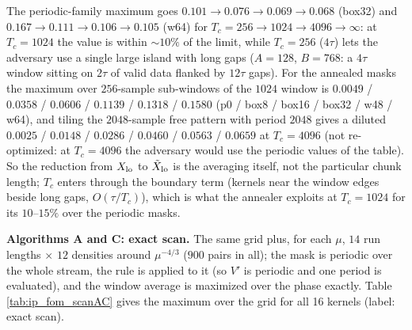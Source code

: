 \documentclass{article}
\numberwithin{equation}{section}   %
\begin{document}
The periodic-family maximum goes $0.101 \rightarrow 0.076 \rightarrow 0.069 \rightarrow 0.068$ (box32)
and $0.167 \rightarrow 0.111 \rightarrow 0.106 \rightarrow 0.105$ (w64) for
$T_c = 256 \rightarrow 1024 \rightarrow 4096 \rightarrow \infty$: at $T_c = 1024$ the value is within
$\sim 10\%$ of the limit, while $T_c = 256$ ($4\tau$) lets the adversary use a single large island with
long gaps ($A = 128$, $B = 768$: a $4\tau$ window sitting on $2\tau$ of valid data flanked by $12\tau$
gaps).  For the annealed masks the maximum over $256$-sample sub-windows of the $1024$ window is
$0.0049$ / $0.0358$ / $0.0606$ / $0.1139$ / $0.1318$ / $0.1580$ (p0 / box8 / box16 / box32 / w48 / w64), and
tiling the $2048$-sample free pattern with period $2048$ gives a diluted $0.0025$ / $0.0148$ / $0.0286$ /
$0.0460$ / $0.0563$ / $0.0659$ at $T_c = 4096$ (not re-optimized: at $T_c = 4096$ the adversary would use the
periodic values of the table).  So the reduction from $X_{\rm lo}$ to $\tilde X_{\rm lo}$ is the
averaging itself, not the particular chunk length; $T_c$ enters through the boundary term (kernels near
the window edges beside long gaps, $O(\tau/T_c)$), which is what the annealer exploits at $T_c = 1024$ for
its $10$--$15\%$ over the periodic masks.

{\bf Algorithms A and C: exact scan.}  The same grid plus, for each $\mu$, $14$ run lengths $\times$ $12$
densities around $\mu^{-4/3}$ ($900$ pairs in all); the mask is periodic over the whole stream, the rule
is applied to it (so $V'$ is periodic and one period is evaluated), and the window average is maximized
over the phase exactly.  Table \ref{tab:ip_fom_scanAC} gives the maximum over the grid for all 16 kernels
(label: exact scan).
\end{document}
